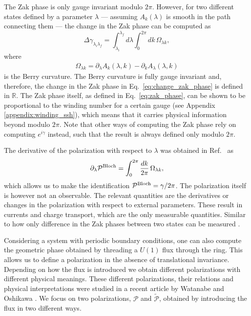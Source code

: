 \documentclass[twocolumn,amsmath,longbibliography,amssymb,superscriptaddress]{revtex4-1}
\begin{document}
The Zak phase is only gauge invariant modulo $2\pi$. However, for two different states defined by a parameter $\lambda$ --- assuming $A_k(\lambda)$ is smooth in the path connecting them --- the change in the Zak phase can be computed as
\begin{equation}
\Delta {\gamma_{\lambda_i \lambda_f}} = \int_{\lambda_i}^{\lambda_f} d\lambda\int_{0}^{2\pi} dk \, \Omega_{\lambda k},
\label{eq:change_zak_phase}
\end{equation}
where 
\begin{align}\label{eq:BerryCurvature}
\Omega_{\lambda k} = \partial_\lambda A_k(\lambda,k) - \partial_k A_\lambda(\lambda,k)
\end{align}
 is the Berry curvature. The Berry curvature is fully gauge invariant and, therefore, the change in the Zak phase in Eq.~\eqref{eq:change_zak_phase} is defined in $\mathbb{R}$. %
The Zak phase itself, as defined in Eq.~\eqref{eq:zak_phase}, can be shown to be proportional to the winding number for a certain gauge (see Appendix \ref{appendix:winding_ssh}), which means that it carries physical information beyond modulo $2\pi$. Note that other ways of computing the Zak phase rely on computing $e^{i\gamma}$ instead, such that the result is always defined only modulo $2\pi$.

The derivative of the polarization with respect to $\lambda$ was obtained in Ref.~\cite{KingSmith1993} as
\begin{equation}\label{eq:Bloch_polarization}
\partial_\lambda \mathcal{P}^{\rm Bloch} = \int_{0}^{2\pi} \frac{dk}{2\pi} \, \Omega_{\lambda k},
\end{equation}
which allows us to make the identification $ \mathcal{P}^{\rm Bloch} = \gamma/2\pi$. The polarization itself is however not an observable. The relevant quantities are the derivatives or changes in the polarization with respect to external parameters. These result in currents and charge transport, which are the only measurable quantities. Similar to how only difference in the Zak phases between two states can be measured \cite{Atala2013}. 

Considering a system with periodic boundary conditions, one can also compute the geometric phase obtained by threading a $U(1)$ flux through the ring. This allows us to define a polarization in the absence of translational invariance. Depending on how the flux is introduced we obtain different polarizations with different physical meanings. These different polarizations, their relations and physical interpretations were studied in a recent article by Watanabe and Oshikawa \cite{Watanabe2018}. We focus on two polarizations, $\mathcal{P}$ and $\tilde{\mathcal{P}}$, obtained by introducing the flux in two different ways.
\end{document}
